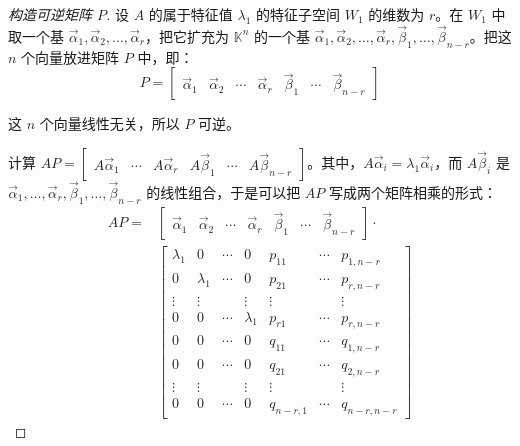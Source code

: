 \begin{proof}[构造可逆矩阵 $P$]
	设 $A$ 的属于特征值 $\lambda_1$ 的特征子空间 $W_1$ 的维数为 $r$。在 $W_1$ 中取一个基 $\vec \alpha_1, \vec \alpha_2, \ldots, \vec \alpha_r$，把它扩充为 $\mathbb K^n$ 的一个基 $\vec \alpha_1, \vec \alpha_2, \ldots, \vec \alpha_r, \vec \beta_1, \ldots, \vec \beta_{n - r}$。把这 $n$ 个向量放进矩阵 $P$ 中，即：
	$$
	P = \begin{bmatrix} \vec \alpha_1 & \vec \alpha_2 & \cdots & \vec \alpha_r & \vec \beta_1 & \cdots & \vec \beta_{n - r} \end{bmatrix}
	$$

	这 $n$ 个向量线性无关，所以 $P$ 可逆。

	计算 $AP = \begin{bmatrix} A \vec \alpha_1 & \cdots & A \vec \alpha_r & A \vec \beta_1 & \cdots & A \vec \beta_{n - r} \end{bmatrix}$。其中，$A \vec \alpha_i = \lambda_1 \vec \alpha_i$，而 $A \vec \beta_i$ 是 $\vec \alpha_1, \ldots, \vec \alpha_r, \vec \beta_1, \ldots, \vec \beta_{n - r}$ 的线性组合，于是可以把 $AP$ 写成两个矩阵相乘的形式：
	$$
	\begin{aligned}
		AP =&
		\begin{bmatrix} \vec \alpha_1 & \vec \alpha_2 & \cdots & \vec \alpha_r & \vec \beta_1 & \cdots & \vec \beta_{n - r} \end{bmatrix} \cdot
		\\&
		\begin{bmatrix}
			\lambda_1 & 0 & \cdots & 0 & p_{11} & \cdots & p_{1, n - r}
			\\
			0 & \lambda_1 & \cdots & 0 & p_{21} & \cdots & p_{r, n - r}
			\\
			\vdots & \vdots & & \vdots & \vdots & & \vdots
			\\
			0 & 0 & \cdots & \lambda_1 & p_{r1} & \cdots & p_{r, n - r}
			\\
			0 & 0 & \cdots & 0 & q_{11} & \cdots & q_{1, n - r}
			\\
			0 & 0 & \cdots & 0 & q_{21} & \cdots & q_{2, n - r}
			\\
			\vdots & \vdots & & \vdots & \vdots & & \vdots
			\\
			0 & 0 & \cdots & 0 & q_{n - r, 1} & \cdots & q_{n - r, n - r}
		\end{bmatrix}
	\end{aligned}
	$$


\end{proof}
